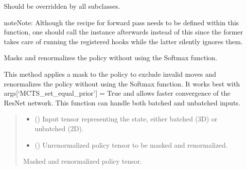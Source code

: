 \documentclass[letterpaper,10pt,english]{sphinxmanual}
\begin{document}
\begin{fulllineitems}
\begin{fulllineitems}
\sphinxAtStartPar
Should be overridden by all subclasses.

\begin{sphinxadmonition}{note}{Note:}
\sphinxAtStartPar
Although the recipe for forward pass needs to be defined within
this function, one should call the  instance afterwards
instead of this since the former takes care of running the
registered hooks while the latter silently ignores them.
\end{sphinxadmonition}

\end{fulllineitems}


\begin{fulllineitems}
\label{\detokenize{modules:Resnet.ResNet.mask_and_renorm_NoSoftmax}}
\pysigstartsignatures
{}
\pysigstopsignatures
\sphinxAtStartPar
Masks and renormalizes the policy without using the Softmax function.

\sphinxAtStartPar
This method applies a mask to the policy to exclude invalid moves and renormalizes
the policy without using the Softmax function. It works best with args{[}‘MCTS\_set\_equal\_prior’{]} = True
and allows faster convergence of the ResNet network. This function can handle both batched and unbatched inputs.
\begin{quote}\begin{description}
\begin{itemize}
\item {} 
\sphinxAtStartPar
{} () \textendash{} Input tensor representing the state, either batched (3D) or unbatched (2D).

\item {} 
\sphinxAtStartPar
{} () \textendash{} Unrenormalized policy tensor to be masked and renormalized.

\end{itemize}

\sphinxAtStartPar
Masked and renormalized policy tensor.


\end{description}
\end{quote}
\end{fulllineitems}
\end{fulllineitems}
\end{document}

